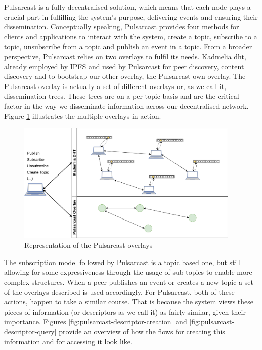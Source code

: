 Pulsarcast is a fully decentralised solution, which means that each node plays
a crucial part in fulfilling the system's purpose, delivering events and
ensuring their dissemination. Conceptually speaking, Pulsarcast provides four
methods for clients and applications to interact with the system, create a
topic, subscribe to a topic, unsubscribe from a topic and publish an event in a
topic. From a broader perspective, Pulsarcast relies on two overlays to fulfil
its needs. Kadmelia \acrshort{dht}, already employed by IPFS and used by
Pulsarcast for peer discovery, content discovery and to bootstrap our other
overlay, the Pulsarcast own overlay. The Pulsarcast overlay is actually a set of
different overlays or, as we call it, dissemination trees.  These trees are on
a per topic basis and are the critical factor in the way we disseminate
information across our decentralised network.  Figure
\ref{fig:pulsarcast-overlays} illustrates the multiple overlays in action.

\begin{figure}[hb!]
  \centering
  \includegraphics[width=0.95\textwidth]{../images/pulsarcast-overlays.png}
  \caption{Representation of the Pulsarcast overlays}
  \label{fig:pulsarcast-overlays}
\end{figure}

The subscription model followed by Pulsarcast is a topic based one, but still
allowing for some expressiveness through the usage of sub-topics to enable more
complex structures. When a peer publishes an event or creates a new topic a set
of the overlays described is used accordingly. For Pulsarcast, both of these
actions, happen to take a similar course. That is because the system views
these pieces of information (or descriptors as we call it) as fairly similar,
given their importance. Figures \ref{fig:pulsarcast-descriptor-creation} and
\ref{fig:pulsarcast-descriptor-query} provide an overview of how the flows for
creating this information and for accessing it look like.

